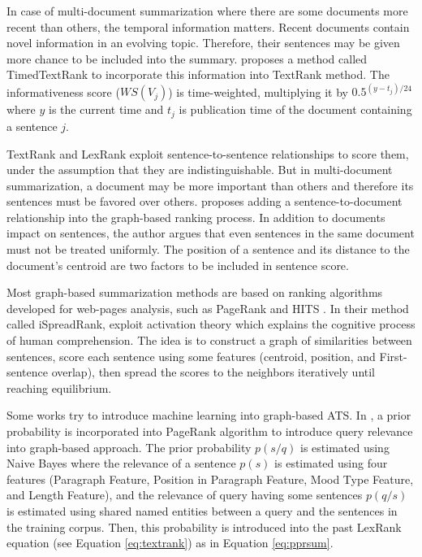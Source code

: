 In case of multi-document summarization where there are some documents more recent than others, the temporal information matters. 
Recent documents contain novel information in an evolving topic.
Therefore, their sentences may be given more chance to be included into the summary. 
\citet{07-wan} proposes a method called TimedTextRank to incorporate this information into TextRank method.
The informativeness score ($ WS(V_j) $) is time-weighted, multiplying it by $ 0.5^{(y - t_j)/24} $ where $ y $ is the current time and $ t_j $ is publication time of the document containing a sentence $ j $.

TextRank and LexRank exploit sentence-to-sentence relationships to score them, under the assumption that they are indistinguishable.
But in multi-document summarization, a document may be more important than others and therefore its sentences must be favored over others.
\citet{08-wan} proposes adding a sentence-to-document relationship into the graph-based ranking process. 
In addition to documents impact on sentences, the author argues that even sentences in the same document must not be treated uniformly.
The position of a sentence and its distance to the document's centroid are two factors to be included in sentence score.


Most graph-based summarization methods \citep{04-mihalcea-tarau,04-erkan-radev,06-li-al,08-wan} are based on ranking algorithms developed for web-pages analysis, such as PageRank \citep{98-brin-page} and HITS \citep{99-kleinberg}. 
In their method called iSpreadRank, \citet{08-yeh-al} exploit activation theory \citep{68-quillian} which explains the cognitive process of human comprehension.
The idea is to construct a graph of similarities between sentences, score each sentence using some features (centroid, position, and First-sentence overlap), then spread the scores to the neighbors iteratively until reaching equilibrium.


Some works try to introduce machine learning into graph-based ATS. 
In \citep{08-liu-al}, a prior probability is incorporated into PageRank algorithm to introduce query relevance into graph-based approach. 
The prior probability $ p(s/q) $ is estimated using Naive Bayes where the relevance of a sentence $ p(s) $ is estimated using four features (Paragraph Feature, Position in Paragraph Feature, Mood Type Feature, and Length Feature), and the relevance of query having some sentences $ p(q/s) $ is estimated using shared named entities between a query and the sentences in the training corpus.
Then, this probability is introduced into the past LexRank equation (see Equation \ref{eq:textrank}) as in Equation \ref{eq:pprsum}.


